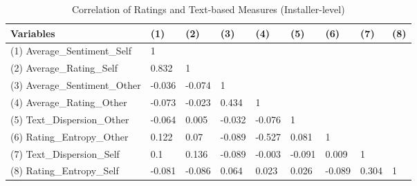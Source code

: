 \begin{table}[H]
\centering
\begin{tabular}{@{}lllllllll@{}}
\toprule
Variables                     & (1)    & (2)    & (3)    & (4)    & (5)    & (6)    & (7)   & (8) \\ \midrule
(1) Average\_Sentiment\_Self  & 1      &        &        &        &        &        &       &     \\
(2) Average\_Rating\_Self     & 0.832  & 1      &        &        &        &        &       &     \\
(3) Average\_Sentiment\_Other & -0.036 & -0.074 & 1      &        &        &        &       &     \\
(4) Average\_Rating\_Other    & -0.073 & -0.023 & 0.434  & 1      &        &        &       &     \\
(5) Text\_Dispersion\_Other   & -0.064 & 0.005  & -0.032 & -0.076 & 1      &        &       &     \\
(6) Rating\_Entropy\_Other    & 0.122  & 0.07   & -0.089 & -0.527 & 0.081  & 1      &       &     \\
(7) Text\_Dispersion\_Self    & 0.1    & 0.136  & -0.089 & -0.003 & -0.091 & 0.009  & 1     &     \\
(8) Rating\_Entropy\_Self     & -0.081 & -0.086 & 0.064  & 0.023  & 0.026  & -0.089 & 0.304 & 1   \\ \bottomrule
\end{tabular}%
\caption{Correlation of Ratings and Text-based Measures (Installer-level) }
\label{corr_measures_dispersion_text_and_rating}
\end{table} 